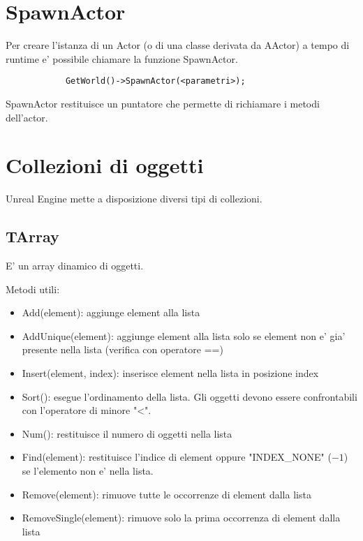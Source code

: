     \section{SpawnActor}

        Per creare l'istanza di un Actor (o di una classe derivata da AActor) a tempo di runtime e' possibile chiamare la funzione SpawnActor.

        \begin{verbatim}
            GetWorld()->SpawnActor(<parametri>);
        \end{verbatim}

        SpawnActor restituisce un puntatore che permette di richiamare i metodi dell'actor.


    \section{Collezioni di oggetti}

        Unreal Engine mette a disposizione diversi tipi di collezioni.

        \subsection{TArray}
            E' un array dinamico di oggetti.

            Metodi utili:
            \begin{itemize}
                \item Add(element): aggiunge element alla lista
                \item AddUnique(element): aggiunge element alla lista solo se element non e' gia' presente nella lista (verifica con operatore ==)
                \item Insert(element, index): inserisce element nella lista in posizione index
                \item Sort(): esegue l'ordinamento della lista. Gli oggetti devono essere confrontabili con l'operatore di minore "<".
                \item Num(): restituisce il numero di oggetti nella lista
                \item Find(element): restituisce l'indice di element oppure "INDEX\_NONE" ($-1$) se l'elemento non e' nella lista.
                \item Remove(element): rimuove tutte le occorrenze di element dalla lista
                \item RemoveSingle(element): rimuove solo la prima occorrenza di element dalla lista
            \end{itemize}

